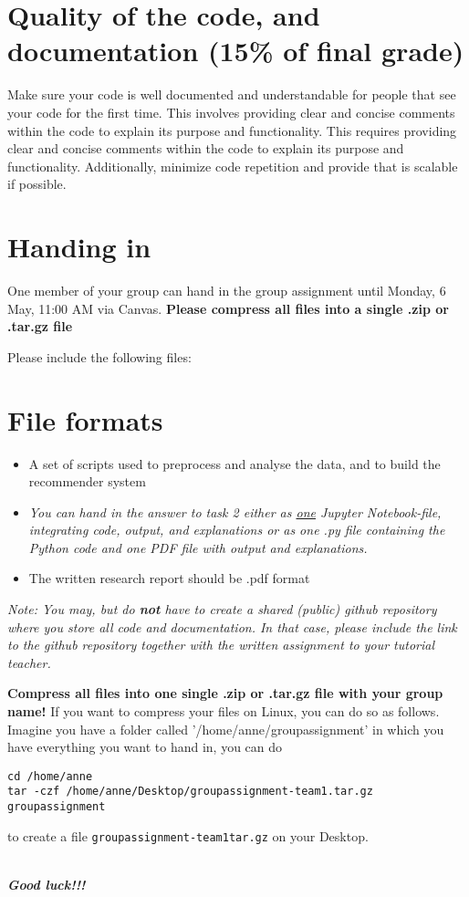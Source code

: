 \section{Quality of the code, and documentation (15\% of final grade)}

Make sure your code is well documented and understandable for people that see your code for the first time. This involves providing clear and concise comments within the code to explain its purpose and functionality.
This requires providing clear and concise comments within the code to explain its purpose and functionality. Additionally, minimize code repetition and provide that is scalable if possible. 

\section{Handing in}
One member of your group can hand in the group assignment until Monday, 6 May, 11:00 AM via Canvas. \textbf{Please compress all files into a single .zip or .tar.gz file} 

Please include the following files:   
\section*{File formats}

\begin{itemize}
	\item  A set of scripts used to preprocess and analyse the data, and to build the recommender system
	\item \emph{
		You can hand in the answer to task 2 \emph{either} as \underline{one} Jupyter Notebook-file, integrating code, output, and explanations \emph{or} as one .py file containing the Python code and one PDF file with output and explanations.
	}
	\item The written research report should be .pdf format
\end{itemize}

\emph{Note: You may, but do \textbf{not} have to create a shared (public) github repository where you store all code and documentation. In that case, please include the link to the github repository together with the written assignment to your tutorial teacher.}

\textbf{Compress all files into one single .zip or .tar.gz file with your group name!}
If you want to compress your files on Linux, you can do so as follows. Imagine you have a folder called '/home/anne/groupassignment' in which you have everything you want to hand in, you can do

\begin{lstlisting}
cd /home/anne
tar -czf /home/anne/Desktop/groupassignment-team1.tar.gz groupassignment
\end{lstlisting}
to create a file \texttt{groupassignment-team1tar.gz} on your Desktop.


~\\
\textbf{\emph{Good luck!!!}}